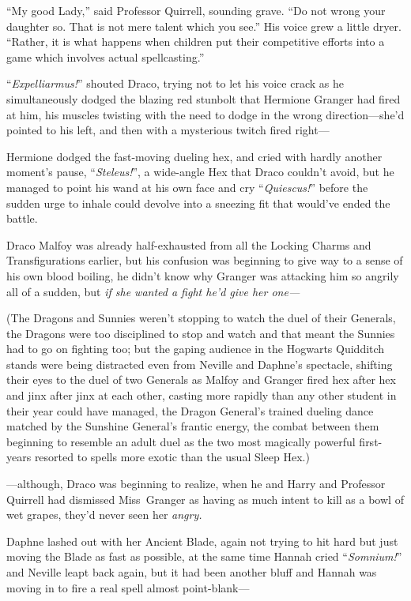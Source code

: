 “My good Lady,” said Professor Quirrell, sounding grave. “Do not wrong your daughter so. That is not mere talent which you see.” His voice grew a little dryer. “Rather, it is what happens when children put their competitive efforts into a game which involves actual spellcasting.”

\later

“\emph{Expelliarmus!}” shouted Draco, trying not to let his voice crack as he simultaneously dodged the blazing red stunbolt that Hermione Granger had fired at him, his muscles twisting with the need to dodge in the wrong direction—she’d pointed to his left, and then with a mysterious twitch fired right—

Hermione dodged the fast-moving dueling hex, and cried with hardly another moment’s pause, “\emph{Steleus!}”, a wide-angle Hex that Draco couldn’t avoid, but he managed to point his wand at his own face and cry “\emph{Quiescus!}” before the sudden urge to inhale could devolve into a sneezing fit that would’ve ended the battle.

Draco Malfoy was already half-exhausted from all the Locking Charms and Transfigurations earlier, but his confusion was beginning to give way to a sense of his own blood boiling, he didn’t know why Granger was attacking him so angrily all of a sudden, but \emph{if she wanted a fight he’d give her one—}

(The Dragons and Sunnies weren’t stopping to watch the duel of their Generals, the Dragons were too disciplined to stop and watch and that meant the Sunnies had to go on fighting too; but the gaping audience in the Hogwarts Quidditch stands were being distracted even from Neville and Daphne’s spectacle, shifting their eyes to the duel of two Generals as Malfoy and Granger fired hex after hex and jinx after jinx at each other, casting more rapidly than any other student in their year could have managed, the Dragon General’s trained dueling dance matched by the Sunshine General’s frantic energy, the combat between them beginning to resemble an adult duel as the two most magically powerful first-years resorted to spells more exotic than the usual Sleep Hex.)

—although, Draco was beginning to realize, when he and Harry and Professor Quirrell had dismissed Miss~Granger as having as much intent to kill as a bowl of wet grapes, they’d never seen her \emph{angry.}

\later

Daphne lashed out with her Ancient Blade, again not trying to hit hard but just moving the Blade as fast as possible, at the same time Hannah cried “\emph{Somnium!}” and Neville leapt back again, but it had been another bluff and Hannah was moving in to fire a real spell almost point-blank—

